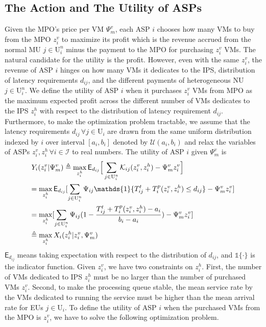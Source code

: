 \documentclass[conference]{IEEEtran}
\begin{document}
\subsection{The Action and The Utility of ASPs}
Given the MPO's price per VM $\Psi_m^v$, each ASP $i$ chooses how many VMs to buy from the MPO $z_i^v$ to maximize its profit which is the revenue accrued from the normal MU $j \in \mathrm{U}_i^n$ minus the payment to the MPO for purchasing $z_i^v$ VMs. The natural candidate for the utility is the profit. However, even with the same $z_i^v$, the revenue of ASP $i$ hinges on how many VMs it dedicates to the IPS, distribution of latency requirements $d_{ij}$, and the different payments of heterogeneous NU $j \in \mathrm{U}_i^n$. We define the utility of ASP $i$ when it purchases $z_i^v$ VMs from MPO as the maximum expected profit across the different number of VMs dedicates to the IPS $z_i^h$ with respect to the distribution of latency requirement $d_{ij}$. Furthermore, to make the optimization problem tractable, we assume that the latency requirements $d_{ij} \, \forall j \in \mathrm{U}_i$ are drawn from the same uniform distribution indexed by $i$ over interval $[a_i, b_i]$ denoted by $\mathcal{U}(a_i,b_i)$ and relax the variables of ASPs $z_i^v, z_i^h \, \forall i \in \mathcal{I}$ to real numbers. The utility of ASP $i$ given $\Psi_m^v$ is
\begin{align}
&Y_i(z_i^v|\Psi_m^v) \triangleq \max_{z_i^h} \mathsf{E}_{d_{ij}}\Big[\sum_{j \in \mathrm{U}_i^n} \mathcal{K}_{ij}(z_i^v, z_i^h) - \Psi_m^v z_i^v\Big] \\
&\hspace*{-1mm}=\max_{z_i^h} \mathsf{E}_{d_{ij}}[\sum_{j \in \mathrm{U}_i^n}\Psi_{ij}\mathds{1}\{T_{ij}^t + T_i^p(z_i^v, z_i^h) \leq d_{ij}\} - \Psi_m^vz_i^v] \nonumber \\
&\hspace*{-1mm}=\max_{z_i^h} [\sum_{j \in \mathrm{U}_i^n}\Psi_{ij}(1-\frac{T_{ij}^t + T_i^p(z_i^v, z_i^h)-a_i}{b_i-a_i}) - \Psi_m^vz_i^v] \label{eqn:asp_def_subobjective_unfold} \\
&\hspace*{-1mm}\triangleq \max_{z_i^h} X_i(z_i^h|z_i^v,\Psi_m^v) \label{eqn:asp_def_subobjective}
\end{align}
$\mathsf{E}_{d_{ij}}$ means taking expectation with respect to the distribution of $d_{ij}$, and $\mathds{1}\{\cdot\}$ is the indicator function. Given $z_i^v$, we have two constraints on $z_i^h$. First, the number of VMs dedicated to IPS $z_i^h$ must be no larger than the number of purchased VMs $z_i^v$. Second, to make the processing queue stable, the mean service rate by the VMs dedicated to running the service must be higher than the mean arrival rate for EUs $j \in \mathrm{U}_i$. To define the utility of ASP $i$ when the purchased VMs from the MPO is $z_i^v$, we have to solve the following optimization problem.
\end{document}

